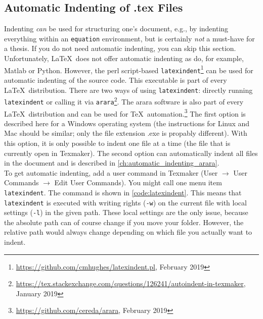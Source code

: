 \subsection{Automatic Indenting of .tex Files}\label{subsec:automatic_indenting_latexindent}
Indenting \emph{can} be used for structuring one's document, e.g., by indenting everything within an \verb+equation+ environment, but is certainly \emph{not} a must-have for a thesis. If you do not need automatic indenting, you can skip this section.\\
Unfortunately, \LaTeX\ does not offer automatic indenting as do, for example, Matlab or Python. However, the perl script-based \verb+latexindent+\footnote{\url{https://github.com/cmhughes/latexindent.pl}, February 2019} can be used for automatic indenting of the source code. This executable is part of every \LaTeX\ distribution. There are two ways of using \verb+latexindent+: directly running \verb+latexindent+ or calling it via \verb+arara+\footnote{\url{https://tex.stackexchange.com/questions/126241/autoindent-in-texmaker}, January 2019}. The arara software is also part of every \LaTeX\ distribution and can be used for \TeX\ automation.\footnote{\url{https://github.com/cereda/arara}, February 2019} The first option is described here for a Windows operating system (the instructions for Linux and Mac should be similar; only the file extension .exe is propably different). With this option, it is only possible to indent one file at a time (the file that is currently open in Texmaker). The second option can automatically indent all files in the document and is described in \autoref{ch:automatic_indenting_arara}.\\
To get automatic indenting, add a user command in Texmaker (User $\rightarrow$ User Commands $\rightarrow$ Edit User Commands). You might call one menu item \verb+latexindent+. The command is shown in \autoref{code:latexindent}. This means that \verb+latexindent+ is executed with writing rights (\verb+-w+) on the current  file with local settings (\verb+-l+) in the given path. These local settings are the only issue, because the absolute path can of course change if you move your folder. However, the relative path would always change depending on which file you actually want to indent.\\
